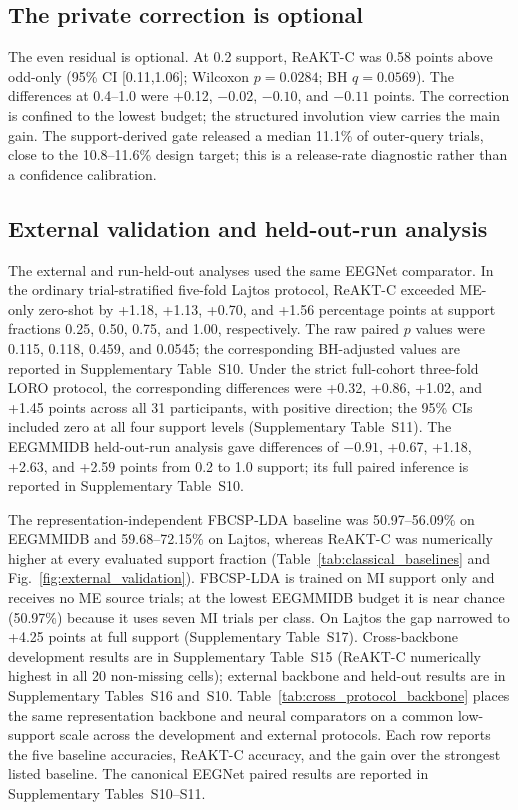 \documentclass[preprint,12pt]{elsarticle}
\begin{document}


\subsection{The private correction is optional}\label{sec:correction}
The even residual is optional. At 0.2 support, ReAKT-C was 0.58 points above odd-only (95\% CI [0.11,1.06]; Wilcoxon $p=0.0284$; BH $q=0.0569$). The differences at 0.4--1.0 were +0.12, $-0.02$, $-0.10$, and $-0.11$ points. The correction is confined to the lowest budget; the structured involution view carries the main gain. The support-derived gate released a median 11.1\% of outer-query trials, close to the 10.8--11.6\% design target; this is a release-rate diagnostic rather than a confidence calibration.
\subsection{External validation and held-out-run analysis}

The external and run-held-out analyses used the same EEGNet comparator. In the ordinary trial-stratified five-fold Lajtos protocol, ReAKT-C exceeded ME-only zero-shot by +1.18, +1.13, +0.70, and +1.56 percentage points at support fractions 0.25, 0.50, 0.75, and 1.00, respectively. The raw paired $p$ values were 0.115, 0.118, 0.459, and 0.0545; the corresponding BH-adjusted values are reported in Supplementary Table~S10. Under the strict full-cohort three-fold LORO protocol, the corresponding differences were +0.32, +0.86, +1.02, and +1.45 points across all 31 participants, with positive direction; the 95\% CIs included zero at all four support levels (Supplementary Table~S11). The EEGMMIDB held-out-run analysis gave differences of $-0.91$, +0.67, +1.18, +2.63, and +2.59 points from 0.2 to 1.0 support; its full paired inference is reported in Supplementary Table~S10.

The representation-independent FBCSP-LDA baseline was 50.97--56.09\% on EEGMMIDB and 59.68--72.15\% on Lajtos, whereas ReAKT-C was numerically higher at every evaluated support fraction (Table~\ref{tab:classical_baselines} and Fig.~\ref{fig:external_validation}). FBCSP-LDA is trained on MI support only and receives no ME source trials; at the lowest EEGMMIDB budget it is near chance (50.97\%) because it uses seven MI trials per class. On Lajtos the gap narrowed to +4.25 points at full support (Supplementary Table~S17). Cross-backbone development results are in Supplementary Table~S15 (ReAKT-C numerically highest in all 20 non-missing cells); external backbone and held-out results are in Supplementary Tables~S16 and~S10.
Table~\ref{tab:cross_protocol_backbone} places the same representation backbone and neural comparators on a common low-support scale across the development and external protocols. Each row reports the five baseline accuracies, ReAKT-C accuracy, and the gain over the strongest listed baseline. The canonical EEGNet paired results are reported in Supplementary Tables~S10--S11.
\end{document}
